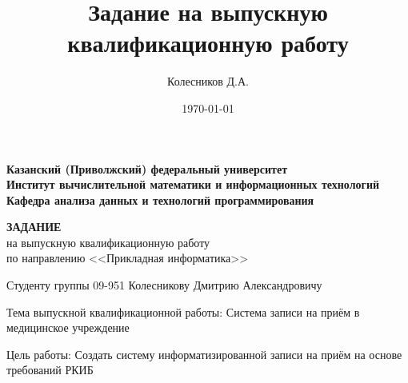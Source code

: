 \documentclass[a4paper,12pt]{extarticle}
\author{Колесников Д.А.}
\title{Задание на выпускную квалификационную работу}
\date{\today}
\begin{document}
    \begin{center}
        {\bfseries Казанский (Приволжский) федеральный университет \\
        Институт вычислительной математики и информационных технологий \\
        Кафедра анализа данных и технологий программирования} \\
    \end{center}

    \begin{center}
        {\bfseries ЗАДАНИЕ} \\
        на выпускную квалификационную работу \\
        по направлению <<Прикладная информатика>>
    \end{center}

    \begin{flushleft}
        Студенту группы 09-951 Колесникову Дмитрию Александровичу

        Тема выпускной квалификационной работы: Система записи на приём в медицинское учреждение

        Цель работы: Создать систему информатизированной записи на приём на основе требований РКИБ
    \end{flushleft}
    
    \vspace{-1em}
\end{document}
